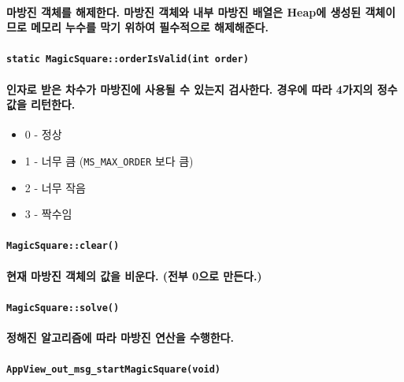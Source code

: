 \documentclass[UTF8]{report}
\begin{document}
            \paragraph{%
                \normalfont 마방진 객체를 해제한다. 마방진 객체와 내부 마방진 배열은 Heap에 생성된 객체이므로 메모리 누수를 막기 위하여 필수적으로 해제해준다.
            }

            \paragraph{\texttt{static MagicSquare::orderIsValid(int order)}}
            \paragraph{%
                \normalfont 인자로 받은 차수가 마방진에 사용될 수 있는지 검사한다. 경우에 따라 4가지의 정수 값을 리턴한다.
            }

            \begin{itemize}
                \item 0 - 정상
                \item 1 - 너무 큼 (\texttt{MS\_MAX\_ORDER} 보다 큼)
                \item 2 - 너무 작음
                \item 3 - 짝수임
            \end{itemize}

            \paragraph{\texttt{MagicSquare::clear()}}
            \paragraph{%
                \normalfont 현재 마방진 객체의 값을 비운다. (전부 0으로 만든다.)
            }

            \paragraph{\texttt{MagicSquare::solve()}}
            \paragraph{%
                \normalfont 정해진 알고리즘에 따라 마방진 연산을 수행한다.
            }

            \paragraph{\texttt{AppView\_out\_msg\_startMagicSquare(void)}}
\end{document}
